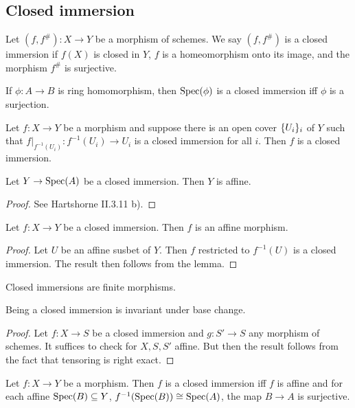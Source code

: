 \documentclass{memoir}
\begin{document}
\subsection{Closed immersion}
\begin{definition}
    Let $(f,f^\#):X\to Y$ be a morphism of schemes.
    We say $(f,f^\#)$ is a closed immersion if $f(X)$ is closed in $Y$, $f$ is a homeomorphism onto its image, and the morphism $f^\#$ is surjective.
\end{definition}
\begin{remark}
    If $\phi:A\to B$ is ring homomorphism, then $\operatorname{Spec}(\phi)$ is a closed immersion iff $\phi$ is a surjection.
\end{remark}
\begin{proposition}
    Let $f:X\to Y$ be a morphism and suppose there is an open cover $\lbrace U_i\rbrace_i$ of $Y$ such that $f|_{f^{-1}(U_i)}:f^{-1}(U_i)\to U_i$ is a closed immersion for all $i$.
    Then $f$ is a closed immersion.
\end{proposition}
\begin{lemma}
    Let $Y\to \operatorname{Spec}(A)$ be a closed immersion. 
    Then $Y$ is affine.
\end{lemma}
\begin{proof}
    See Hartshorne II.3.11 b).
\end{proof}
\begin{corollary}
    Let $f:X\to Y$ be a closed immersion. 
    Then $f$ is an affine morphism.
\end{corollary}
\begin{proof}
    Let $U$ be an affine susbet of $Y$.
    Then $f$ restricted to $f^{-1}(U)$ is a closed immersion.
    The result then follows from the lemma.
\end{proof}
\begin{corollary}
    Closed immersions are finite morphisms.
\end{corollary}
\begin{thm}
    Being a closed immersion is invariant under base change.
\end{thm}
\begin{proof}
    Let $f:X\to S$ be a closed immersion and $g:S'\to S$ any morphism of schemes.
    It suffices to check for $X,S,S'$ affine.
    But then the result follows from the fact that tensoring is right exact.
\end{proof}
\begin{thm}
    Let $f:X\to Y$ be a morphism.
    Then $f$ is a closed immersion iff $f$ is affine and for each affine $\operatorname{Spec}(B)\subseteq Y$, $f^{-1}(\operatorname{Spec}(B)) \cong \operatorname{Spec}(A)$, the map $B\to A$ is surjective.
\end{thm}
\end{document}
